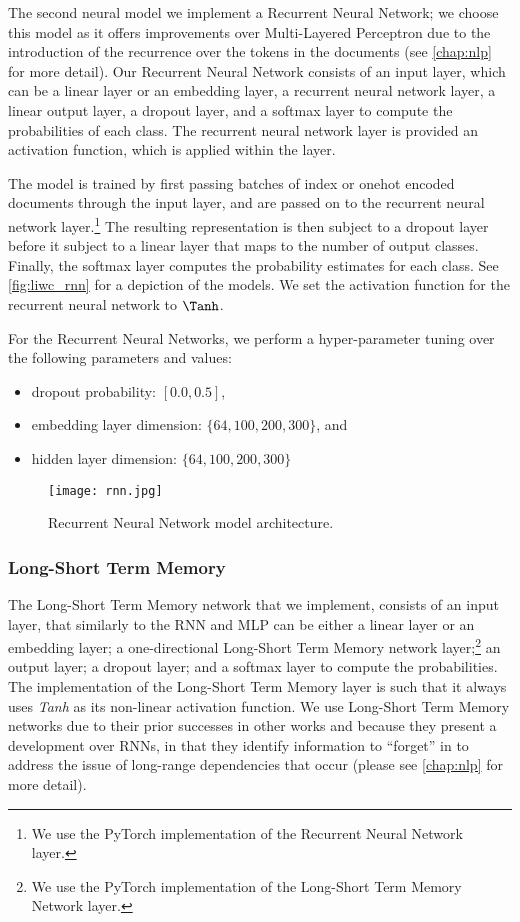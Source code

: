 The second neural model we implement a Recurrent Neural Network; we choose this model as it offers improvements over Multi-Layered Perceptron due to the introduction of the recurrence over the tokens in the documents (see \autoref{chap:nlp} for more detail). Our Recurrent Neural Network consists of an input layer, which can be a linear layer or an embedding layer, a recurrent neural network layer, a linear output layer, a dropout layer, and a softmax layer to compute the probabilities of each class. The recurrent neural network layer is provided an activation function, which is applied within the layer. 

The model is trained by first passing batches of index or onehot encoded documents through the input layer, and are passed on to the recurrent neural network layer.\footnote{We use the PyTorch implementation of the Recurrent Neural Network layer.} The resulting representation is then subject to a dropout layer before it subject to a linear layer that maps to the number of output classes. Finally, the softmax layer computes the probability estimates for each class. See \autoref{fig:liwc_rnn} for a depiction of the models. We set the activation function for the recurrent neural network to $\Tanh$.

For the Recurrent Neural Networks, we perform a hyper-parameter tuning over the following parameters and values:

\begin{itemize}
  \item dropout probability: $[0.0, 0.5]$,
  \item embedding layer dimension: $\{64, 100, 200, 300\}$, and
  \item hidden layer dimension: $\{64, 100, 200, 300\}$
\end{itemize}

\begin{figure}
  \centering
  \texttt{[image: rnn.jpg]}
  \caption{Recurrent Neural Network model architecture.}
  \label{fig:liwc_rnn}
\end{figure}

\subsubsection{Long-Short Term Memory}

The Long-Short Term Memory network that we implement, consists of an input layer, that similarly to the RNN and MLP can be either a linear layer or an embedding layer; a one-directional Long-Short Term Memory network layer;\footnote{We use the PyTorch implementation of the Long-Short Term Memory Network layer.} an output layer; a dropout layer; and a softmax layer to compute the probabilities. The implementation of the Long-Short Term Memory layer is such that it always uses \textit{Tanh} as its non-linear activation function. We use Long-Short Term Memory networks due to their prior successes in other works \cite{CITE: LSTM papers} and because they present a development over RNNs, in that they identify information to ``forget'' in to address the issue of long-range dependencies that occur (please see \autoref{chap:nlp} for more detail).

